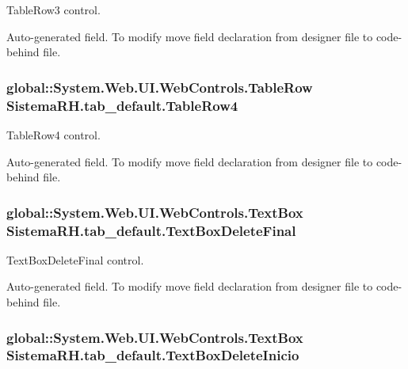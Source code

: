 TableRow3 control. 

Auto-\/generated field. To modify move field declaration from designer file to code-\/behind file. \hypertarget{class_sistema_r_h_1_1tab__default_a107b1ffc0d66d24e04ded294ad6f6af3}{
\subsubsection[{TableRow4}]{\setlength{\rightskip}{0pt plus 5cm}global::System.Web.UI.WebControls.TableRow {\bf SistemaRH.tab\_\-default.TableRow4}}}
\label{class_sistema_r_h_1_1tab__default_a107b1ffc0d66d24e04ded294ad6f6af3}


TableRow4 control. 

Auto-\/generated field. To modify move field declaration from designer file to code-\/behind file. \hypertarget{class_sistema_r_h_1_1tab__default_a39fd36375294cf2a913cfb885371f852}{
\subsubsection[{TextBoxDeleteFinal}]{\setlength{\rightskip}{0pt plus 5cm}global::System.Web.UI.WebControls.TextBox {\bf SistemaRH.tab\_\-default.TextBoxDeleteFinal}}}
\label{class_sistema_r_h_1_1tab__default_a39fd36375294cf2a913cfb885371f852}


TextBoxDeleteFinal control. 

Auto-\/generated field. To modify move field declaration from designer file to code-\/behind file. \hypertarget{class_sistema_r_h_1_1tab__default_a2a3d69806b2f9a7dc9725ad82fa805b2}{
\subsubsection[{TextBoxDeleteInicio}]{\setlength{\rightskip}{0pt plus 5cm}global::System.Web.UI.WebControls.TextBox {\bf SistemaRH.tab\_\-default.TextBoxDeleteInicio}}}
\label{class_sistema_r_h_1_1tab__default_a2a3d69806b2f9a7dc9725ad82fa805b2}


